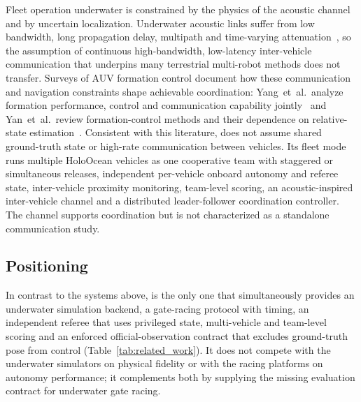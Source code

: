 Fleet operation underwater is constrained by the physics of the acoustic channel and by uncertain localization. Underwater acoustic links suffer from low bandwidth, long propagation delay, multipath and time-varying attenuation~\cite{stojanovic2009underwater}, so the assumption of continuous high-bandwidth, low-latency inter-vehicle communication that underpins many terrestrial multi-robot methods does not transfer. Surveys of AUV formation control document how these communication and navigation constraints shape achievable coordination: Yang~et~al.\ analyze formation performance, control and communication capability jointly~\cite{yang2021survey} and Yan~et~al.\ review formation-control methods and their dependence on relative-state estimation~\cite{yan2023formation}. Consistent with this literature, \mra{} does not assume shared ground-truth state or high-rate communication between vehicles. Its fleet mode runs multiple HoloOcean vehicles as one cooperative team with staggered or simultaneous releases, independent per-vehicle onboard autonomy and referee state, inter-vehicle proximity monitoring, team-level scoring, an acoustic-inspired inter-vehicle channel and a distributed leader-follower coordination controller. The channel supports coordination but is not characterized as a standalone communication study.

\subsection{Positioning}

In contrast to the systems above, \mra{} is the only one that simultaneously provides an underwater simulation backend, a gate-racing protocol with timing, an independent referee that uses privileged state, multi-vehicle and team-level scoring and an enforced official-observation contract that excludes ground-truth pose from control (Table~\ref{tab:related_work}). It does not compete with the underwater simulators on physical fidelity or with the racing platforms on autonomy performance; it complements both by supplying the missing evaluation contract for underwater gate racing.
